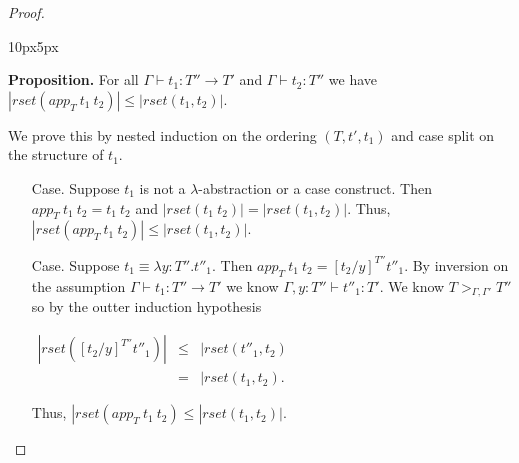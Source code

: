 \begin{proof}
\begin{changemargin}{10px}{5px}
\begin{itemize}
  {\bf Proposition.}  For all $\Gamma \vdash t_1:T'' \to T'$ and $\Gamma \vdash t_2:T''$ we have \\
  $|rset(app_T\ t_1\ t_2)| \leq |rset(t_1,t_2)|$.
  
  
  We prove this by nested induction on the ordering $(T, t', t_1)$ and case split on the structure of $t_1$. 
  
  \begin{itemize}
  \item[Case.] Suppose $t_1$ is not a $\lambda$-abstraction or a case construct.  Then
    $app_T\ t_1\ t_2 = t_1\ t_2$ and $|rset(t_1\ t_2)| = |rset(t_1,t_2)|$.  Thus,\\
    $|rset(app_T\ t_1\ t_2)| \leq |rset(t_1,t_2)|$.  
    
  \item[Case.] Suppose $t_1 \equiv \lambda y:T''.t''_1$.  Then $app_T\ t_1\ t_2 = [t_2/y]^{T''} t''_1$.
    By inversion on the assumption $\Gamma \vdash t_1:T'' \to T'$ we know $\Gamma,y:T'' \vdash t''_1:T'$.  
    We know $T >_{\Gamma,\Gamma'} T''$ so by the outter induction hypothesis 
    \begin{center}
      \begin{math}
        \begin{array}{lll}
          |rset([t_2/y]^{T''} t''_1)| & \leq & |rset(t''_1,t_2)\\
          & =    & |rset(t_1,t_2).
        \end{array}
      \end{math}
    \end{center}
    Thus, $|rset(app_T\ t_1\ t_2) \leq |rset(t_1,t_2)|$.
    

\end{itemize}
\end{itemize}
\end{changemargin}
\end{proof}
